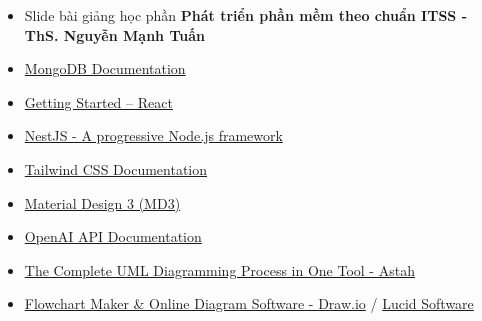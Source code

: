 \documentclass[../main.tex]{subfiles}
\begin{document}
\begin{itemize}
    \item[{[1]}] Slide bài giảng học phần \textbf{Phát triển phần mềm theo chuẩn ITSS - ThS. Nguyễn Mạnh Tuấn}
    \item[{[2]}] \href{https://docs.mongodb.com/}{MongoDB Documentation}
    \item[{[3]}] \href{https://react.dev/learn}{Getting Started – React}
    \item[{[4]}] \href{https://docs.nestjs.com/}{NestJS - A progressive Node.js framework}
    \item[{[5]}] \href{https://tailwindcss.com/docs}{Tailwind CSS Documentation}
    \item[{[6]}] \href{https://m3.material.io/}{Material Design 3 (MD3)}
    \item[{[7]}] \href{https://platform.openai.com/docs/}{OpenAI API Documentation}
    \item[{[8]}] \href{https://astah.net/products/astah-uml/uml-diagrams/}{The Complete UML Diagramming Process in One Tool - Astah}
    \item[{[9]}] \href{https://app.diagrams.net/}{Flowchart Maker \& Online Diagram Software - Draw.io} / \href{https://lucid.co/}{Lucid Software}
\end{itemize}
\end{document}
